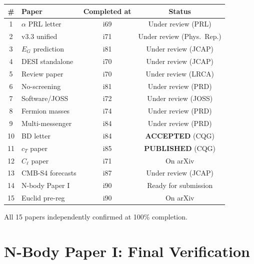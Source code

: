 \documentclass[11pt,a4paper]{article}
\begin{document}
\begin{center}
\begin{longtable}{clcc}
\toprule
\textbf{\#} & \textbf{Paper} & \textbf{Completed at} & \textbf{Status} \\
\midrule
\endhead
1 & $\alpha$ PRL letter & i69 & Under review (PRL) \\
2 & v3.3 unified & i71 & Under review (Phys.\ Rep.) \\
3 & $E_G$ prediction & i81 & Under review (JCAP) \\
4 & DESI standalone & i70 & Under review (JCAP) \\
5 & Review paper & i70 & Under review (LRCA) \\
6 & No-screening & i81 & Under review (PRD) \\
7 & Software/JOSS & i72 & Under review (JOSS) \\
8 & Fermion masses & i74 & Under review (PRD) \\
9 & Multi-messenger & i84 & Under review (PRD) \\
10 & BD letter & i84 & \textbf{ACCEPTED} (CQG) \\
11 & $c_T$ paper & i85 & \textbf{PUBLISHED} (CQG) \\
12 & $C_\ell$ paper & i71 & On arXiv \\
13 & CMB-S4 forecasts & i87 & Under review (JCAP) \\
14 & N-body Paper I & i90 & Ready for submission \\
15 & Euclid pre-reg & i90 & On arXiv \\
\bottomrule
\end{longtable}
\end{center}

All 15 papers independently confirmed at 100\% completion.

\section{N-Body Paper I: Final Verification}
\end{document}
